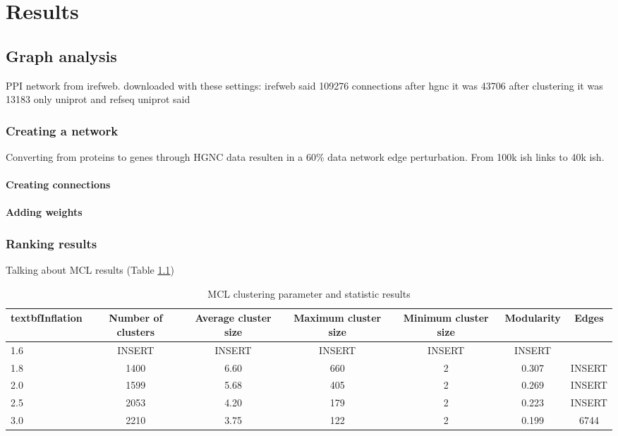 \part{Results}
\label{pa:results}
\chapter{Graph analysis}
PPI network from irefweb.
downloaded with these settings: %
irefweb said 109276 connections 
after hgnc it was 43706
after clustering it was 13183 %
only uniprot and refseq
uniprot said
\section{Creating a network}
Converting from proteins to genes through HGNC data resulten in a 60\% data
network edge perturbation. From 100k ish links to 40k ish.
\subsection{Creating connections}
\subsection{Adding weights}
\section{Ranking results}
Talking about MCL results (Table \ref{tab:mcl-inflation})
\begin{table}
    \centering
    \begin{tabular}{| l | c | c | c | c | c | c |}
        \\textbf{Inflation} & \textbf{Number of clusters} & \textbf{Average
    cluster size} & \textbf{Maximum cluster size} & \textbf{Minimum cluster
    size} & \textbf{Modularity} & \textbf{Edges}\\
        \hline
        1.6 & INSERT & INSERT & INSERT & INSERT & INSERT \\
        1.8 & 1400 & 6.60 & 660 & 2 & 0.307 & INSERT \\
        2.0 & 1599 & 5.68 & 405 & 2 & 0.269 & INSERT \\
        2.5 & 2053 & 4.20 & 179 & 2 & 0.223 & INSERT \\
        3.0 & 2210 & 3.75 & 122 & 2 & 0.199 & 6744 \\
        \hline
    \end{tabular}
    \caption{MCL clustering parameter and statistic results}
    \label{tab:mcl-inflation}
\end{table}
